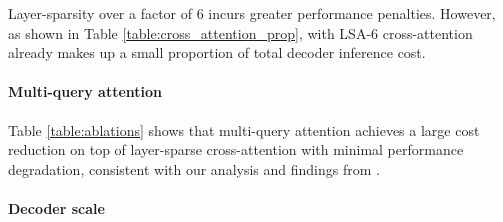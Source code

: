 Layer-sparsity over a factor of 6 incurs greater performance penalties. However, as shown in Table \ref{table:cross_attention_prop}, with LSA-6 cross-attention already makes up a small proportion of total decoder inference cost.

\paragraph{Multi-query attention}

Table \ref{table:ablations} shows that multi-query attention achieves a large cost reduction on top of layer-sparse cross-attention with minimal performance degradation, consistent with our analysis and findings from \citet{multiquery}.

\paragraph{Decoder scale}
